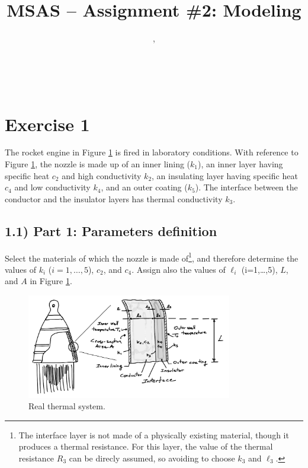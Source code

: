\documentclass[11pt,a4paper,oneside]{article}
\title{MSAS -- Assignment \#2: Modeling} %
\author{\large \tr{Student Name}, \tr{123456}}
\date{}
\makeatletter
\newcommand\headlinecolor{\normalcolor}
\renewcommand*\maketitle{%
    \begingroup
    \centering
    \fontsize{15}{15}%
    \selectfont
    \headlinecolor
    \@title\\
    \vspace{5mm}
    \@author
    \par
    \vskip1in
    \endgroup
    \vspace{-22mm}
}
\makeatother
\begin{document}
\maketitle

\thispagestyle{fancy}


\section*{Exercise 1}
The rocket engine in Figure \ref{fig:therm} is fired in laboratory conditions. With reference to Figure \ref{fig:therm}, the nozzle is made up of an inner lining ($k_1$), an inner layer having specific heat $c_2$ and high conductivity $k_2$, an insulating layer having specific heat $c_4$ and low conductivity $k_4$, and an outer coating ($k_5$). The interface between the conductor and the insulator layers has thermal conductivity $k_3$.

\subsection*{1.1) Part 1: Parameters definition}
Select the materials of which the nozzle is made of\footnote{The interface layer is not made of a physically existing material, though it produces a thermal resistance. For this layer, the value of the thermal resistance $R_3$ can be direcly assumed, so avoiding to choose $k_3$ and $\ell_3$.}, and therefore determine the values of $k_i$ ($i=1,\dots,5$), $c_2$, and $c_4$. Assign also the values of $\ell_i$ (i=1,\dots,5), $L$, and $A$ in Figure \ref{fig:therm}.
\begin{figure}[h!]
\centering
\includegraphics[width=0.8\textwidth]{fig_therm.pdf}
\caption{\label{fig:therm} Real thermal system.}
\end{figure}
\end{document}
